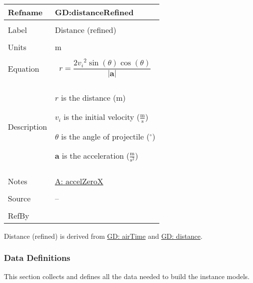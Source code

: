 \documentclass[12pt]{article}
\begin{document}
\noindent \begin{minipage}{\textwidth}
\begin{tabular}{p{} p{}}
\toprule \textbf{Refname} & \textbf{GD:distanceRefined}
\label{GD:distanceRefined}
\\ \midrule \\
Label & Distance (refined)
\\ \midrule \\
Units & m
\\ \midrule \\
Equation & \begin{displaymath}
           r=\frac{2 {v_{i}}^{2} \sin\left(θ\right) \cos\left(θ\right)}{|\mathbf{a}|}
           \end{displaymath}
\\ \midrule \\
Description & \begin{symbDescription}
              \item{$r$ is the distance (m)}
              \item{${v_{i}}$ is the initial velocity ($\frac{\text{m}}{\text{s}}$)}
              \item{$θ$ is the angle of projectile (${}^{\circ}$)}
              \item{$\mathbf{a}$ is the acceleration ($\frac{\text{m}}{\text{s}^{2}}$)}
              \end{symbDescription}
\\ \midrule \\
Notes & \hyperref[accelZeroX]{A: accelZeroX}
\\ \midrule \\
Source & --
\\ \midrule \\
RefBy & 
\\ \bottomrule \end{tabular}
\end{minipage}
Distance (refined) is derived from \hyperref[GD:airTime]{GD: airTime} and \hyperref[GD:distance]{GD: distance}.
\subsubsection{Data Definitions}
\label{Sec:DDs}
This section collects and defines all the data needed to build the instance models.
\par~
\end{document}
